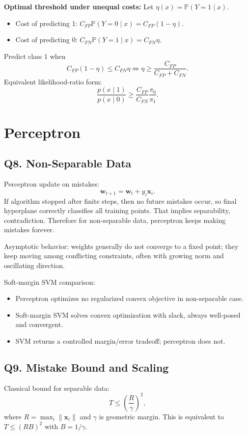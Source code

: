 \documentclass[11pt]{article}
\newcommand{\Pp}{\mathbb{P}}
\newcommand{\1}{\mathbf{1}}
\newcommand{\xx}{\mathbf{x}}
\newcommand{\ww}{\mathbf{w}}
\begin{document}
\textbf{Optimal threshold under unequal costs:}
Let $\eta(x)=\Pp(Y=1\mid x)$.
\begin{itemize}
\item Cost of predicting 1: $C_{FP}\Pp(Y=0\mid x)=C_{FP}(1-\eta)$.
\item Cost of predicting 0: $C_{FN}\Pp(Y=1\mid x)=C_{FN}\eta$.
\end{itemize}
Predict class 1 when
\[
C_{FP}(1-\eta)\le C_{FN}\eta
\iff
\eta\ge\frac{C_{FP}}{C_{FP}+C_{FN}}.
\]
Equivalent likelihood-ratio form:
\[
\frac{p(x\mid1)}{p(x\mid0)}\ge\frac{C_{FP}}{C_{FN}}\frac{\pi_0}{\pi_1}.
\]

\section{Perceptron}

\subsection*{Q8. Non-Separable Data}
Perceptron update on mistakes:
\[
\ww_{t+1}=\ww_t+y_i\xx_i.
\]
If algorithm stopped after finite steps, then no future mistakes occur, so final hyperplane correctly classifies all training points. That implies separability, contradiction. Therefore for non-separable data, perceptron keeps making mistakes forever.

Asymptotic behavior: weights generally do not converge to a fixed point; they keep moving among conflicting constraints, often with growing norm and oscillating direction.

Soft-margin SVM comparison:
\begin{itemize}
\item Perceptron optimizes no regularized convex objective in non-separable case.
\item Soft-margin SVM solves convex optimization with slack, always well-posed and convergent.
\item SVM returns a controlled margin/error tradeoff; perceptron does not.
\end{itemize}

\subsection*{Q9. Mistake Bound and Scaling}
Classical bound for separable data:
\[
T\le\left(\frac{R}{\gamma}\right)^2,
\]
where $R=\max_i\|\xx_i\|$ and $\gamma$ is geometric margin. This is equivalent to $T\le(RB)^2$ with $B=1/\gamma$.
\end{document}
